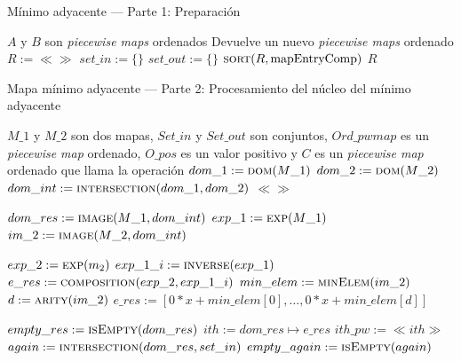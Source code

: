 \begin{algorithm}
\caption{Mínimo adyacente — Parte 1: Preparación}
\label{alg:minadj-ord}
\begin{algorithmic}[1]
\Require $A$ y $B$ son \textit{piecewise maps} ordenados
\Ensure Devuelve un nuevo \textit{piecewise maps} ordenado 
    \State $R := \ll\gg$
    \State $set\_in := \{\}$
    \State $set\_out := \{\}$
    \State {}
    \State $\Call{sort}{R, \mathrm{mapEntryComp}}$
    \State \Return $R$
\EndFunction
\end{algorithmic}
\end{algorithm}

\begin{algorithm}
\caption{Mapa mínimo adyacente — Parte 2: Procesamiento del núcleo del mínimo adyacente}
\label{alg:minadj-ord-proc}
\begin{algorithmic}[1]
\Require $M\_1$ y $M\_2$ son dos mapas, $Set\_in$ y $Set\_out$ son conjuntos, $Ord\_pwmap$ es un \textit{piecewise map} ordenado, $O\_pos$ es un valor positivo y $C$ es un \textit{piecewise map} ordenado que llama la operación
    \State $dom\_1 := \Call{dom}{M\_1}$
    \State $dom\_2 := \Call{dom}{M\_2}$
    \State $dom\_int := \Call{intersection}{dom\_1, dom\_2}$
        \State \Return $\ll\gg$
    \EndIf

    \State $dom\_res := \Call{image}{M\_1, dom\_int}$
    \State $exp\_1 := \Call{exp}{M\_1}$
    \State $im\_2 := \Call{image}{M\_2, dom\_int}$

        \State $exp\_2 := \Call{exp}{m_2}$
        \State $exp\_1\_i := \Call{inverse}{exp\_1}$
        \State $e\_res := \Call{composition}{exp\_2, exp\_1\_i}$
    \Else
        \State $min\_elem := \Call{minElem}{im\_2}$
        \State $d := \Call{arity}{im\_2}$
        \State $e\_res := [0*x+min\_elem[0],\dots,0*x+min\_elem[d]]$
    \EndIf

    \State $empty\_res := \Call{isEmpty}{dom\_res}$
        \State $ith := dom\_res \mapsto e\_res$
        \State $ith\_pw := \ll ith\gg$
        \State $again := \Call{intersection}{dom\_res, set\_in}$
        \State $empty\_again := \Call{isEmpty}{again}$


\end{algorithmic}
\end{algorithm}
